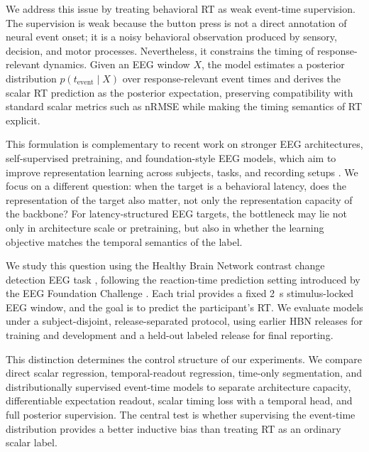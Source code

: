 \documentclass[12pt]{article}
\begin{document}
We address this issue by treating behavioral RT as weak event-time supervision. The supervision is weak because the button press is not a direct annotation of neural event onset; it is a noisy behavioral observation produced by sensory, decision, and motor processes. Nevertheless, it constrains the timing of response-relevant dynamics. Given an EEG window \(X\), the model estimates a posterior distribution \(p(t_{\mathrm{event}}\mid X)\) over response-relevant event times and derives the scalar RT prediction as the posterior expectation, preserving compatibility with standard scalar metrics such as nRMSE while making the timing semantics of RT explicit.

This formulation is complementary to recent work on stronger EEG architectures, self-supervised pretraining, and foundation-style EEG models, which aim to improve representation learning across subjects, tasks, and recording setups \citep{wang2024eegpt,Jiang2024LaBraM,Chen2024EEGFormer,Wang2025EEGMamba,ElOuahidi2025REVE,Yue2024BrainGPT}. We focus on a different question: when the target is a behavioral latency, does the representation of the target also matter, not only the representation capacity of the backbone? For latency-structured EEG targets, the bottleneck may lie not only in architecture scale or pretraining, but also in whether the learning objective matches the temporal semantics of the label.

We study this question using the Healthy Brain Network contrast change detection EEG task \citep{Shirazi2024HBNEEG}, following the reaction-time prediction setting introduced by the EEG Foundation Challenge \citep{EEGFoundationChallengeArxiv2025,EEGChallengeWebsite2025}. Each trial provides a fixed 2~s stimulus-locked EEG window, and the goal is to predict the participant's RT. We evaluate models under a subject-disjoint, release-separated protocol, using earlier HBN releases for training and development and a held-out labeled release for final reporting.

This distinction determines the control structure of our experiments. We compare direct scalar regression, temporal-readout regression, time-only segmentation, and distributionally supervised event-time models to separate architecture capacity, differentiable expectation readout, scalar timing loss with a temporal head, and full posterior supervision. The central test is whether supervising the event-time distribution provides a better inductive bias than treating RT as an ordinary scalar label.
\end{document}
